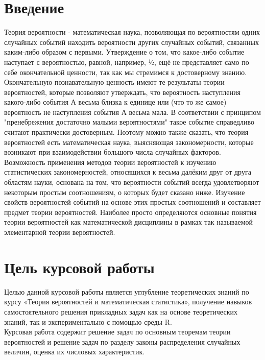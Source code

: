 \chapter{\textbf{Введение}}
Теория вероятности - математическая наука, позволяющая по вероятностям одних случайных событий находить вероятности других случайных событий, связанных каким-либо образом с первыми. Утверждение о том, что какое-либо событие наступает с вероятностью, равной, например, ½, ещё не представляет само по себе окончательной ценности, так как мы стремимся к достоверному знанию. Окончательную познавательную ценность имеют те результаты теории вероятностей, которые позволяют утверждать, что вероятность наступления какого-либо события А весьма близка к единице или (что то же самое) вероятность не наступления события А весьма мала. В соответствии с принципом "пренебрежения достаточно малыми вероятностями"  такое событие справедливо считают практически достоверным. Поэтому можно также сказать, что теория вероятностей есть математическая наука, выясняющая закономерности, которые возникают при взаимодействии большого числа случайных факторов.\\
Возможность применения методов теории вероятностей к изучению статистических закономерностей, относящихся к весьма далёким друг от друга областям науки, основана на том, что вероятности событий всегда удовлетворяют некоторым простым соотношениям, о которых будет сказано ниже. Изучение свойств вероятностей событий на основе этих простых соотношений и составляет предмет теории вероятностей. Наиболее просто определяются основные понятия теории вероятностей как математической дисциплины в рамках так называемой элементарной теории вероятностей.\\
\chapter{\textbf{Цель курсовой работы}}
Целью данной курсовой работы является углубление теоретических знаний по курсу «Теория вероятностей и математическая статистика», получение навыков самостоятельного решения прикладных задач как на основе теоретических знаний, так и экспериментально с помощью среды R.\\
Курсовая работа содержит решение задач по основным теоремам теории вероятностей и  решение задач по разделу законы распределения случайных величин, оценка их числовых характеристик.
